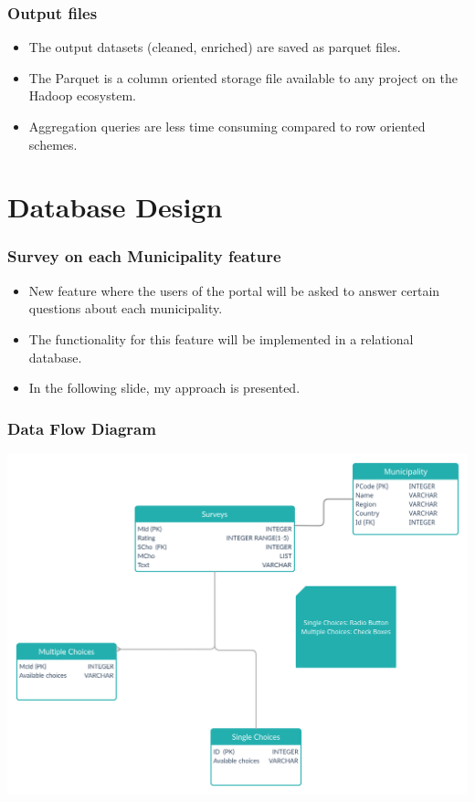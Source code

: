 \documentclass{beamer}
\begin{document}
\begin{frame}
\frametitle{Output files}
\begin{itemize}
\item The output datasets (cleaned, enriched) are saved as parquet files.
\item The Parquet is a column oriented storage file available to any project on the Hadoop ecosystem.
\item Aggregation queries are less time consuming compared to row oriented schemes. 
\end{itemize}
\end{frame}

\section{Database Design}
\begin{frame}
\frametitle{Survey on each Municipality feature}
\begin{itemize}
\item New feature where the users of the portal will be
asked to answer certain questions about each municipality.
\item The functionality for this feature will be implemented in a relational database.
\item In the following slide, my approach is presented.
\end{itemize}
\end{frame}

\begin{frame}
\frametitle{Data Flow Diagram}
\centering
\includegraphics[scale=0.13]{ERD.png}
\end{frame}
\end{document}
